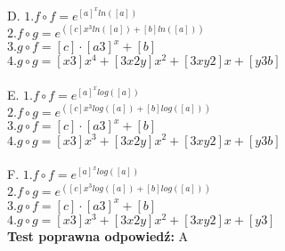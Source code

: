 \documentclass[12pt, a4paper]{article}
\theoremstyle{definition} %
\newcommand{\testStop}{\newline} %
\newcommand{\kluczStart}{\noindent \textbf{Test poprawna odpowiedź:}\newline} %
\newcommand{\kluczStop}{\newline} %
\begin{document}
\\
D. $1. f \circ f = e^{[a]^{x}ln([a])}$\\
$2. f \circ g = e^{([c]x^{3}ln([a])+[b]ln([a]))}$\\
$3. g \circ f = [c]\cdot[a3]^{x}+[b]$\\
$4. g \circ g =[x3]x^{4}+[3x2y]x^{2}+[3xy2]x+[y3b] $\\
\\
E. $1. f \circ f = e^{[a]^{x}log([a])}$\\
$2. f \circ g = e^{([c]x^{3}log([a])+[b]log([a]))}$\\
$3. g \circ f = [c]\cdot[a3]^{x}+[b]$\\
$4. g \circ g =[x3]x^{3}+[3x2y]x^{2}+[3xy2]x+[y3b] $\\
\\
F. $1. f \circ f = e^{[a]^{x}log([a])}$\\
$2. f \circ g = e^{([c]x^{3}log([a])+[b]log([a]))}$\\
$3. g \circ f = [c]\cdot[a3]^{x}+[b]$\\
$4. g \circ g =[x3]x^{3}+[3x2y]x^{2}+[3xy2]x+[y3] $\\
\testStop
\kluczStart
A
\kluczStop
\end{document}
